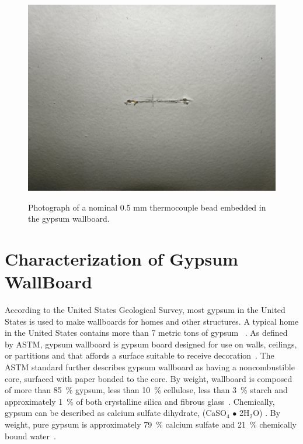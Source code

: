 \documentclass[twoside]{uocthesis}
\begin{document}
{ \begin{figure}
 	\centering
 	\includegraphics[width=\textwidth]{../Figures/IWGB_TC_Slit}\\
 	\caption[Photograph of a thermocouple embedded in the gypsum wallboard]{Photograph of a nominal 0.5 mm thermocouple bead embedded in the gypsum wallboard.}
 	\label{IWGB_TC_Slit}
 \end{figure}


\section{Characterization of Gypsum WallBoard}

According to the United States Geological Survey, most gypsum in the United States is used to make wallboards for homes and other structures.  A typical home in the United States contains more than 7 metric tons of gypsum ~\cite{USGS:2015}.  As defined by ASTM, gypsum wallboard is gypsum board designed for use on walls, ceilings, or partitions and that affords a surface suitable to receive decoration~\cite{ASTM_C1396}. The ASTM standard further describes gypsum wallboard as having a noncombustible core, surfaced with paper bonded to the core. By weight, wallboard is composed of more than 85~\% gypsum, less than 10~\% cellulose, less than 3~\% starch and approximately 1~\% of both crystalline silica and fibrous glass~\cite{GA:2010}. Chemically, gypsum can be described as calcium sulfate dihydrate, (CaSO$_{4}$ $\bullet$ 2H$_{2}$O) .  By weight, pure gypsum is approximately 79~\% calcium sulfate and 21~\% chemically bound water~\cite{Lawson:1977}.

}
\end{document}
